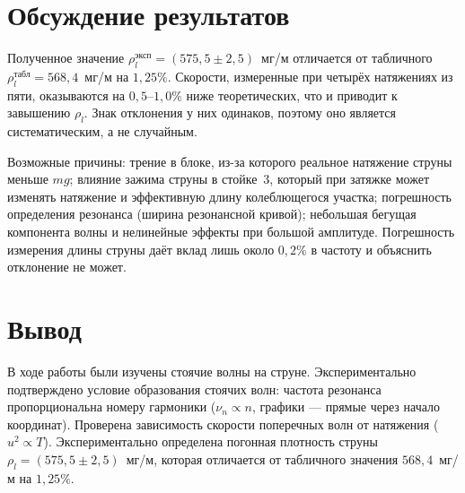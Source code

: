 \documentclass[12pt,a4paper]{article}
\begin{document}
\section{Обсуждение результатов}

Полученное значение $\rho_l^{\text{эксп}}=(575{,}5\pm2{,}5)$~мг/м отличается от табличного $\rho_l^{\text{табл}}=568{,}4$~мг/м на $1{,}25\%$. Скорости, измеренные при четырёх натяжениях из пяти, оказываются на $0{,}5$--$1{,}0\%$ ниже теоретических, что и приводит к завышению $\rho_l$. Знак отклонения у них одинаков, поэтому оно является систематическим, а не случайным.

Возможные причины: трение в блоке, из-за которого реальное натяжение струны меньше $mg$; влияние зажима струны в стойке~3, который при затяжке может изменять натяжение и эффективную длину колеблющегося участка; погрешность определения резонанса (ширина резонансной кривой); небольшая бегущая компонента волны и нелинейные эффекты при большой амплитуде. Погрешность измерения длины струны даёт вклад лишь около $0{,}2\%$ в частоту и объяснить отклонение не может.

\section{Вывод}

В ходе работы были изучены стоячие волны на струне. Экспериментально подтверждено условие образования стоячих волн: частота резонанса пропорциональна номеру гармоники ($\nu_n\propto n$, графики --- прямые через начало координат). Проверена зависимость скорости поперечных волн от натяжения ($u^2\propto T$). Экспериментально определена погонная плотность струны $\rho_l=(575{,}5\pm2{,}5)$~мг/м, которая отличается от табличного значения $568{,}4$~мг/м на $1{,}25\%$.
\end{document}
